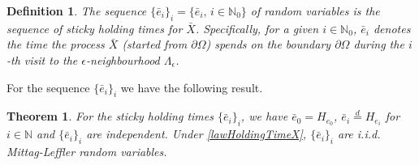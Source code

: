 \documentclass[11pt,a4paper]{article}
\newtheorem{theorem}{Theorem}[section]
\newtheorem{definition}{Definition}
\newcommand{\magenta}{black}
\begin{document}
{\color{\magenta}
\begin{definition}
The sequence $\{\bar{e}_i\}_i = \{\bar{e}_i,\, i \in \mathbb{N}_0\}$ of random variables is the sequence of sticky holding times for $\bar{X}$. Specifically, for a given $i \in \mathbb{N}_0$, $\bar{e}_i$ denotes the time the process $\bar{X}$ (started from $\partial \Omega$) spends on the boundary $\partial \Omega$ during the $i$-th visit to the $\epsilon$-neighbourhood $\Lambda_\epsilon$. 
\label{def:HTXbar}
\end{definition}

For the sequence $\{\bar{e}_i\}_i$ we have the following result.



\begin{theorem}
\label{thm:holdingHatBar}
For the sticky holding times $\{\bar{e}_i\}_i$, we have $\bar{e}_0 = H_{e_0}$, $\bar{e}_i \stackrel{d}{=}H_{e_i}$ for $i \in \mathbb{N}$ and $\{\bar{e}_i\}_i$ are independent. Under \eqref{lawHoldingTimeX}, $\{\bar{e}_i\}_i$ are i.i.d. Mittag-Leffler random variables.
\end{theorem}
}
\end{document}
